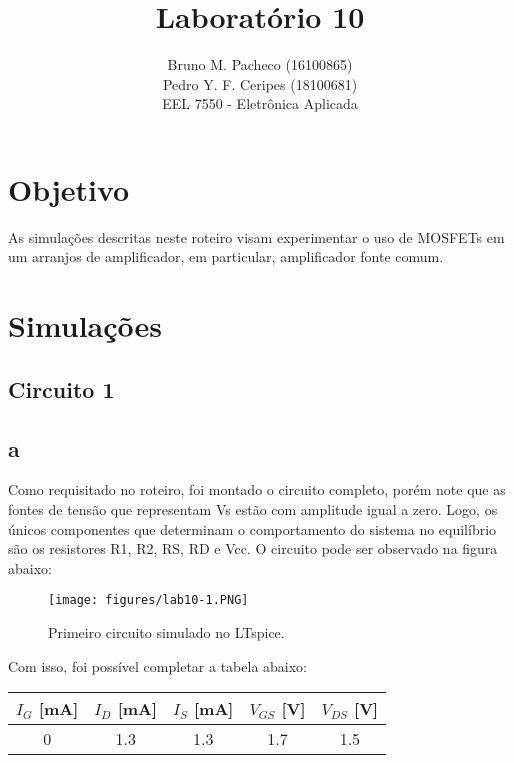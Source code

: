 \documentclass[a4paper]{report}
\begin{document}
 
\title{Laboratório 10}
\author{Bruno M. Pacheco (16100865)\\
Pedro Y. F. Ceripes (18100681) \\
EEL 7550 - Eletrônica Aplicada}

\maketitle
\section*{Objetivo}

As simulações descritas neste roteiro visam experimentar o uso de MOSFETs em um arranjos de amplificador, em particular, amplificador fonte comum.

\section*{Simulações}

\subsection*{Circuito 1}
\subsection*{a}

Como requisitado no roteiro, foi montado o circuito completo, porém note que as fontes de tensão que representam Vs estão com amplitude igual a zero. Logo, os únicos componentes que determinam o comportamento do sistema no equilíbrio são os resistores R1, R2, RS, RD e Vcc. O circuito pode ser observado na figura abaixo:

\begin{figure}[H]
    \centering
    \texttt{[image: figures/lab10-1.PNG]}
    \caption{Primeiro circuito simulado no LTspice.}
\end{figure}

Com isso, foi possível completar a tabela abaixo:

\begin{table}[H]
    \centering
    \begin{tabular}{c | c | c | c | c}
	$I_G$ [mA]  & $I_D$ [mA] & $I_{S}$ [mA]  & $V_{GS}$ [V]  & $V_{DS}$ [V]\\
    \hline
    0 & 1.3 & 1.3 & 1.7 & 1.5 
    \end{tabular}
\end{table}
\end{document}
